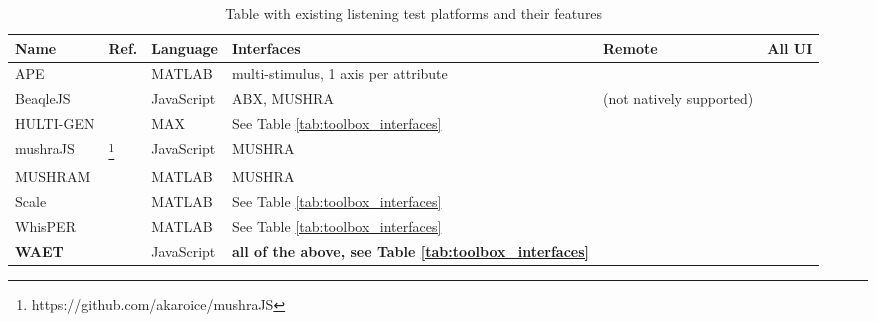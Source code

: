 \documentclass{sig-alternate}
\begin{document}
	\begin{table*}[ht]
    \caption{Table with existing listening test platforms and their features}
    \begin{center}
    	\begin{tabular}{|*{6}{l|}}
    		\hline
    		\textbf{Name} 	& \textbf{Ref.} 	& \textbf{Language} 	& \textbf{Interfaces} 			& \textbf{Remote} 			& \textbf{All UI} 	\\
    		\hline
    		APE 			& \cite{ape}		& MATLAB				& multi-stimulus, 1 axis per attribute 	& 					& 			 \\
    		BeaqleJS		& \cite{beaqlejs}	& JavaScript			& ABX, MUSHRA 					& (not natively supported) 	& 			 \\
    		HULTI-GEN 		& \cite{hultigen}	& MAX 					& See Table \ref{tab:toolbox_interfaces}								& 							& \checkmark \\
    		mushraJS		& \footnote{https://github.com/akaroice/mushraJS} & JavaScript & MUSHRA 			& \checkmark				& 	 \\
    		MUSHRAM			& \cite{mushram}	& MATLAB				& MUSHRA						& 							& 			 \\
    		Scale 			& \cite{scale}		& MATLAB				& See Table \ref{tab:toolbox_interfaces}								&							&			 \\
    		WhisPER			& \cite{whisper}	& MATLAB				& See Table \ref{tab:toolbox_interfaces}								&							& \checkmark \\
    		\textbf{WAET}	& \cite{waet}		& JavaScript			& \textbf{all of the above, see Table \ref{tab:toolbox_interfaces}}		& \checkmark				& \checkmark \\
    		\hline
    	\end{tabular}
    \end{center}
    \label{tab:toolboxes}
    \end{table*}%
\end{document}
